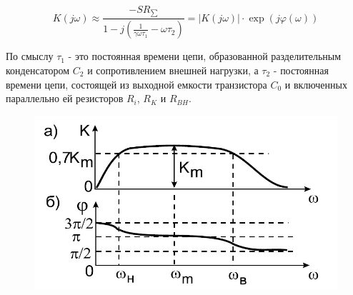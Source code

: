 \begin{equation}
	K(j\omega) \approx \frac{-SR_{\sum}}{1-j(\frac{1}{\gamma \omega \tau_1}-\omega \tau_2)}=|K(j \omega)| \cdot \exp(j \varphi(\omega))
	\label{eq:3}
\end{equation}

По смыслу $\tau_1$ - это постоянная времени цепи, образованной разделительным конденсатором $C_2$ и сопротивлением внешней нагрузки, а $\tau_2$ - постоянная времени цепи, состоящей из выходной емкости транзистора $C_0$ и включенных параллельно ей  резисторов $R_i$, $R_K$ и $R_{BH}$.

\begin{figure}[h!]
	\centering
	\includegraphics[width=0.6\linewidth]{fig/fig5}
	\caption{}
	\label{fig:5}
\end{figure}

